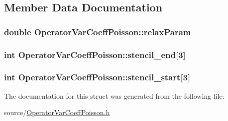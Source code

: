 \subsection{Member Data Documentation}
\hypertarget{struct_operator_var_coeff_poisson_acdb83c08518796d752d5d4ea6440da78}{}
\subsubsection[{relax\+Param}]{\setlength{\rightskip}{0pt plus 5cm}double Operator\+Var\+Coeff\+Poisson\+::relax\+Param}\label{struct_operator_var_coeff_poisson_acdb83c08518796d752d5d4ea6440da78}
\hypertarget{struct_operator_var_coeff_poisson_a94214a00c61d76a9e9fcd814da6926bc}{}
\subsubsection[{stencil\+\_\+end}]{\setlength{\rightskip}{0pt plus 5cm}int Operator\+Var\+Coeff\+Poisson\+::stencil\+\_\+end\mbox{[}3\mbox{]}}\label{struct_operator_var_coeff_poisson_a94214a00c61d76a9e9fcd814da6926bc}
\hypertarget{struct_operator_var_coeff_poisson_ab0aab16ef6f20e19b240eb373c940f68}{}
\subsubsection[{stencil\+\_\+start}]{\setlength{\rightskip}{0pt plus 5cm}int Operator\+Var\+Coeff\+Poisson\+::stencil\+\_\+start\mbox{[}3\mbox{]}}\label{struct_operator_var_coeff_poisson_ab0aab16ef6f20e19b240eb373c940f68}


The documentation for this struct was generated from the following file\+:\begin{DoxyCompactItemize}
\item 
source/\hyperlink{_operator_var_coeff_poisson_8h}{Operator\+Var\+Coeff\+Poisson.\+h}\end{DoxyCompactItemize}
